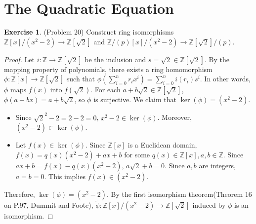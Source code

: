 \documentclass[12pt, psamsfonts]{amsart}
\theoremstyle{definition}
\newtheorem*{exer}{Exercise}
\theoremstyle{remark}
\numberwithin{equation}{section}
\begin{document}
\section{The Quadratic Equation}

\begin{exer}{(Problem 20)}
  Construct ring isomorphisms $\mathbb{Z}[x]/(x^2 - 2) \rightarrow \mathbb{Z}[\sqrt{2}]$ and $\mathbb{Z}/(p)[x]/(x^2 - 2) \rightarrow \mathbb{Z}[\sqrt{2}]/(p)$.
\end{exer}

\begin{proof}
  Let $i: \mathbb{Z} \rightarrow \mathbb{Z}[\sqrt{2}]$ be the inclusion and $s = \sqrt{2} \in \mathbb{Z}[\sqrt{2}]$.
  By the mapping property of polynomials, there exists a ring homomorphism $\phi: \mathbb{Z}[x] \rightarrow \mathbb{Z}[\sqrt{2}]$ such that $\phi(\sum_{i=0}^{n} r_ix^i) = \sum_{i=0}^{n} i(r_i)s^i$.
  In other words, $\phi$ maps $f(x)$ into $f(\sqrt{2})$.
  For each $a + b\sqrt{2} \in \mathbb{Z}[\sqrt{2}]$, $\phi(a + bx) = a + b\sqrt{2}$, so $\phi$ is surjective.
  We claim that $\ker(\phi) = (x^2 - 2)$.
  \begin{itemize}
    \item
      Since $\sqrt{2}^2 - 2 = 2 - 2 = 0$, $x^2 - 2 \in \ker(\phi)$.
      Moreover, $(x^2 - 2) \subset \ker(\phi)$.
    \item
      Let $f(x) \in \ker(\phi)$.
      Since $\mathbb{Z}[x]$ is a Euclidean domain, $f(x) = q(x)(x^2 - 2) + ax + b$ for some $q(x) \in \mathbb{Z}[x], a, b \in \mathbb{Z}$.
      Since $ax + b = f(x) - q(x)(x^2 - 2)$, $a\sqrt{2} + b = 0$.
      Since $a, b$ are integers, $a = b = 0$.
      This implies $f(x) \in (x^2 - 2)$.
  \end{itemize}
  Therefore, $\ker(\phi) = (x^2 - 2)$.
  By the first isomorphism theorem(Theorem 16 on P.97, Dummit and Foote), $\tilde{\phi} : \mathbb{Z}[x]/(x^2 - 2) \rightarrow \mathbb{Z}[\sqrt{2}]$ induced by $\phi$ is an isomorphism.


\end{proof}
\end{document}
